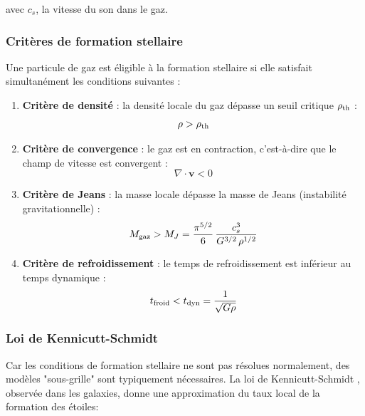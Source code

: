\documentclass{article}
\begin{document}
\noindent avec $c_s$, la vitesse du son dans le gaz.

\subsubsection{Critères de formation stellaire}
Une particule de gaz est éligible à la formation stellaire si elle 
satisfait simultanément les conditions suivantes \cite{Katz1996} :

\begin{enumerate}

    \item \textbf{Critère de densité} : la densité locale du gaz 
    dépasse un seuil critique $\rho_{\rm th}$ :
    \begin{equation}
        \rho > \rho_{\rm th}
        \label{eq:critere_densite}
    \end{equation}

    \item \textbf{Critère de convergence} : le gaz est en contraction, 
    c'est-à-dire que le champ de vitesse est convergent :
    \begin{equation}
        \nabla \cdot \mathbf{v} < 0
        \label{eq:critere_convergence}
    \end{equation}

    \item \textbf{Critère de Jeans} : la masse locale dépasse la 
    masse de Jeans (instabilité gravitationnelle) :
    \begin{equation}
        M_{\rm gaz} > M_J 
        = \frac{\pi^{5/2}}{6}\,\frac{c_s^3}{G^{3/2}\,\rho^{1/2}}
        \label{eq:critere_jeans}
    \end{equation}

    \item \textbf{Critère de refroidissement} : le temps de 
    refroidissement est inférieur au temps dynamique :
    \begin{equation}
        t_{\rm froid} < t_{\rm dyn} = \frac{1}{\sqrt{G\rho}}
        \label{eq:critere_froid}
    \end{equation}

\end{enumerate}

\subsubsection*{Loi de Kennicutt-Schmidt}

Car les conditions de formation stellaire ne sont pas résolues normalement, des modèles "sous-grille" sont typiquement nécessaires. La loi de Kennicutt-Schmidt \citep{Schmidt}, observée dans les galaxies, donne une approximation du taux local de la formation des étoiles:
\end{document}
